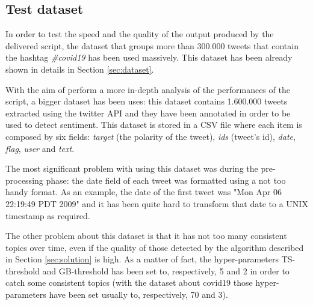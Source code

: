 \subsection{Test dataset}
\label{subsec:test_dataset}
In order to test the speed and the quality of the output produced by the delivered script, the dataset that groups more than 300.000 tweets that contain the hashtag \textit{\#covid19} \cite{covid19-tweets-dataset} has been used massively. This dataset has been already shown in details in Section \ref{sec:dataset}.

With the aim of perform a more in-depth analysis of the performances of the script, a bigger dataset has been uses: this dataset \cite{sentiment-analysis-dataset} contains 1.600.000 tweets extracted using the twitter API and they have been annotated in order to be used to detect sentiment. This dataset is stored in a CSV file where each item is composed by six fields: \textit{target} (the polarity of the tweet), \textit{ids} (tweet's id), \textit{date}, \textit{flag}, \textit{user} and \textit{text}. 

The most significant problem with using this dataset was during the pre-processing phase: the date field of each tweet was formatted using a not too handy format. As an example, the date of the first tweet was "Mon Apr 06 22:19:49 PDT 2009" and it has been quite hard to transform that date to a UNIX timestamp as required.

The other problem about this dataset is that it has not too many consistent topics over time, even if the quality of those detected by the algorithm described in Section \ref{sec:solution} is high. As a matter of fact, the hyper-parameters TS-threshold and GB-threshold has been set to, respectively, 5 and 2 in order to catch some consistent topics (with the dataset about covid19 \cite{covid19-tweets-dataset} those hyper-parameters have been set usually to, respectively, 70 and 3). 